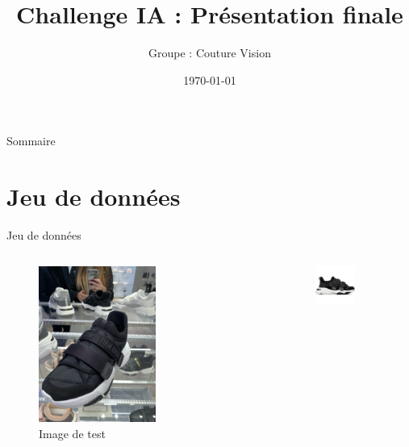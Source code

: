 \documentclass{beamer}
\title{Challenge IA : Présentation finale}
\author{Groupe : Couture Vision}
\date{\today}
\begin{document}
\frame{\titlepage}

\begin{frame}{Sommaire}
\tableofcontents
\end{frame}

\section{Jeu de données}
\begin{frame}{Jeu de données}
\begin{columns}
    \begin{figure}
        \includegraphics[width=0.6\textwidth]{assets/shoe_test.jpg}
        \caption{Image de test}
    \end{figure}
    \begin{figure}
        \includegraphics[width=0.6\textwidth]{assets/shoe_reference.jpeg}

\end{figure}
\end{columns}
\end{frame}
\end{document}
